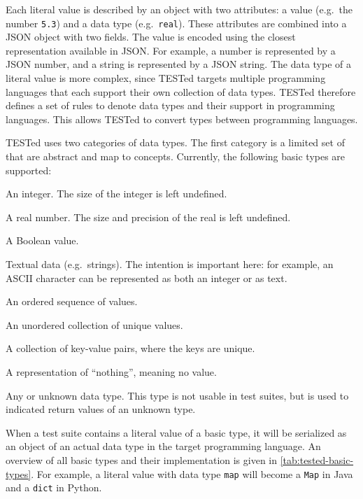\documentclass[../main]{subfiles}
\begin{document}
Each literal value is described by an object with two attributes: a value (e.g.\ the number \texttt{5.3}) and a data type (e.g.\ \texttt{real}).
These attributes are combined into a JSON object with two fields.
The value is encoded using the closest representation available in JSON\@.
For example, a number is represented by a JSON number, and a string is represented by a JSON string.
The data type of a literal value is more complex, since TESTed targets multiple programming languages that each support their own collection of data types.
TESTed therefore defines a set of rules to denote data types and their support in programming languages.
This allows TESTed to convert types between programming languages.

TESTed uses two categories of data types.
The first category is a limited set of  that are abstract and map to concepts.
Currently, the following basic types are supported:

\begin{description}[noitemsep]
    \item[\texttt{integer}] An integer.
        The size of the integer is left undefined.
    \item[\texttt{real}] A real number.
        The size and precision of the real is left undefined.
    \item[\texttt{boolean}] A Boolean value.
    \item[\texttt{text}] Textual data (e.g.\ strings).
          The intention is important here: for example, an ASCII character can be represented as both an integer or as text.
    \item[\texttt{sequence}] An ordered sequence of values.
    \item[\texttt{set}] An unordered collection of unique values.
    \item[\texttt{map}] A collection of key-value pairs, where the keys are unique.
    \item[\texttt{nothing}] A representation of ``nothing'', meaning no value.
    \item[\texttt{any}] Any or unknown data type.
         This type is not usable in test suites, but is used to indicated return values of an unknown type.
\end{description}

When a test suite contains a literal value of a basic type, it will be serialized as an object of an actual data type in the target programming language.
An overview of all basic types and their implementation is given in \cref{tab:tested-basic-types}.
For example, a literal value with data type \texttt{map} will become a \texttt{Map} in Java and a \texttt{dict} in Python.
\end{document}
